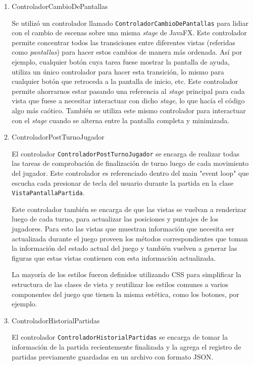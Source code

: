 \documentclass[titlepage,a4paper]{article}
\begin{document}
\begin{enumerate}
\item ControladorCambioDePantallas
\label{sec:orgd157fe5}

Se utilizó un controlador llamado \texttt{ControladorCambioDePantallas} para
lidiar con el cambio de escenas sobre una misma \emph{stage} de
JavaFX. Este controlador permite concentrar todos las transiciones
entre diferentes vistas (referidas como \emph{pantallas}) para hacer estos
cambios de manera más ordenada. Así por ejemplo, cualquier botón cuya
tarea fuese mostrar la pantalla de ayuda, utiliza un único controlador
para hacer esta transición, lo mismo para cualquier botón que
retroceda a la pantalla de inicio, etc. Este controlador permite
ahorrarnos estar pasando una referencia al \emph{stage} principal para cada
vista que fuese a necesitar interactuar con dicho \emph{stage}, lo que hacía
el código algo más caótico. También se utiliza este mismo controlador
para interactuar con el \emph{stage} cuando se alterna entre la pantalla
completa y minimizada.

\item ControladorPostTurnoJugador
\label{sec:orgb381326}

El controlador \texttt{ControladorPostTurnoJugador} se encarga de realizar
todas las tareas de comprobación de finalización de turno luego de
cada movimiento del jugador. Este controlador es referenciado dentro
del main "event loop" que escucha cada presionar de tecla del usuario
durante la partida en la clase \texttt{VistaPantallaPartida}.

Este controlador también se encarga de que las vistas se vuelvan a
renderizar luego de cada turno, para actualizar las posiciones y
puntajes de los jugadores. Para esto las vistas que muestran
información que necesita ser actualizada durante el juego proveen los
métodos correspondientes que toman la información del estado actual
del juego y también vuelven a generar las figuras que estas vistas
contienen con esta información actualizada.

La mayoría de los estilos fueron definidos utilizando CSS para
simplificar la estructura de las clases de vista y reutilizar los
estilos comunes a varios componentes del juego que tienen la misma
estética, como los botones, por ejemplo.

\item ControladorHistorialPartidas
\label{sec:orga192933}

El controlador \texttt{ControladorHistorialPartidas} se encarga de tomar la
información de la partida recientemente finalizada y la agrega el
registro de partidas previamente guardadas en un archivo con formato
JSON.
\end{enumerate}
\end{document}
